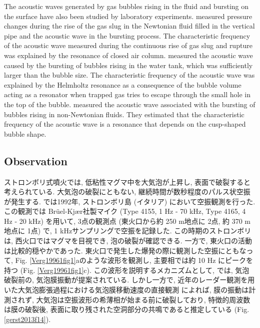 \documentclass[12pt]{article}
\begin{document}
The acoustic waves generated by gas bubbles rising in the fluid and bursting on the surface have also been studied by laboratory experiments.
\cite{James2004} measured pressure changes during the rise of the gas slug in the Newtonian fluid filled in the vertical pipe and the acoustic wave in the bursting process.
The characteristic frequency of the acoustic wave measured during the continuous rise of gas slug and rupture was explained by the resonance of closed air column.
\cite{Spiel1992} measured the acoustic wave caused by the bursting of bubbles rising in the water tank, which was sufficiently larger than the bubble size.
The characteristic frequency of the acoustic wave was explained by the Helmholtz resonance as a consequence of the bubble volume acting as a resonator when trapped gas tries to escape through the small hole in the top of the bubble.
\cite{Divoux2008} measured the acoustic wave associated with the bursting of bubbles rising in non-Newtonian fluids.
They estimated that the characteristic frequency of the acoustic wave is a resonance that depends on the cusp-shaped bubble shape.

\subsection{Observation}\label{AcoinObs}
ストロンボリ式噴火では, 低粘性マグマ中を大気泡が上昇し, 表面で破裂すると考えられている. 大気泡の破裂にともない, 継続時間が数秒程度のパルス状空振が発生する.
\cite{Vergniolle1996b} では1992年, ストロンボリ島 (イタリア) において空振観測を行った. この観測では Br\"uel-Kj\ae r社製マイク (Type 4155, 1 Hz - 70 kHz, Type 4165, 4 Hz - 20 kHz) を用いて, 3点の観測点 (東火口から約 250 m地点に 2点, 約 370 m地点に 1点) で, 1 kHzサンプリングで空振を記録した. 
この時期のストロンボリは, 西火口ではマグマを目視でき, 泡の破裂が確認できる. 一方で, 東火口の活動は比較的穏やかであった. 
東火口で発生した爆発の際に観測した空振にともなって, Fig. \ref{Verg19961fig1}aのような波形を観測し, 主要相では約 10 Hz にピークを持つ (Fig. \ref{Verg19961fig1}c). この波形を説明するメカニズムとして, \cite{Vergniolle1996c} では, 気泡破裂前の, 気泡膜振動が提案されている. 
しかし一方で, 近年のレーダー観測を用いた大気泡膨張過程における気泡膜移動速度の直接観測 \citep{Gerst2013a} によれば, 膜の振動は計測されず, 大気泡は空振波形の希薄相が始まる前に破裂しており, 特徴的周波数は膜の破裂後, 表面に取り残された空洞部分の共鳴であると推定している (Fig. \ref{gerst2013f14}).
\end{document}
